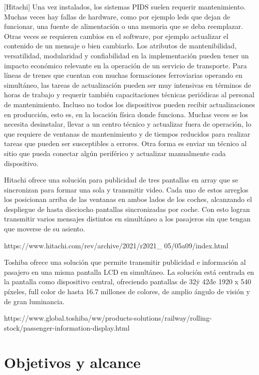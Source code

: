 [Hitachi] Una vez instalados, los sistemas PIDS suelen requerir mantenimiento. Muchas veces hay fallas de hardware, como por ejemplo leds que dejan de funcionar, una fuente de alimentación o una memoria que se deba reemplazar. Otras veces se requieren cambios en el software, por ejemplo actualizar el contenido de un mensaje o bien cambiarlo. Los atributos de mantenibilidad, versatilidad, modularidad y confiabilidad en la implementación pueden tener un impacto económico relevante en la operación de un servicio de transporte. Para líneas de trenes que cuentan con muchas formaciones ferroviarias operando en simultáneo, las tareas de actualización pueden ser muy intensivas en términos de horas de trabajo y requerir también capacitaciones técnicas periódicas al personal de mantenimiento. Incluso no todos los dispositivos pueden recibir actualizaciones en producción, esto es, en la locación física donde funciona. Muchas veces se los necesita desinstalar, llevar a un centro técnico y actualizar fuera de operación, lo que requiere de ventanas de mantenimiento y de tiempos reducidos para realizar tareas que pueden ser susceptibles a errores. Otra forma es enviar un técnico al sitio que pueda conectar algún periférico y actualizar manualmente cada dispositivo.

Hitachi ofrece una solución para publicidad de tres pantallas en array que se sincronizan para formar una sola y transmitir video. Cada uno de estos arreglos los posicionan arriba de las ventanas en ambos lados de los coches, alcanzando el despliegue de hasta dieciocho pantallas sincronizadas por coche. Con esto logran transmitir varios mensajes distintos en simultáneo a los pasajeros sin que tengan que moverse de su asiento.

https://www.hitachi.com/rev/archive/2021/r2021\_ 05/05a09/index.html

Toshiba ofrece una solución que permite transmitir publicidad e información al pasajero en una misma pantalla LCD en simultáneo. La solución está centrada en la pantalla como dispositivo central, ofreciendo pantallas de 32\" y 42\" de 1920 x 540 píxeles, full color de hasta 16.7 millones de colores, de amplio ángulo de visión y de gran luminancia.

https://www.global.toshiba/ww/products-solutions/railway/rolling-stock/passenger-information-display.html

\pagebreak
\section{Objetivos y alcance}

